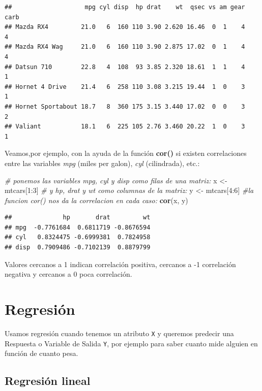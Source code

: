 \documentclass[]{book}
\newenvironment{Shaded}{\begin{snugshade}}{\end{snugshade}}
\newcommand{\KeywordTok}[1]{\textcolor[rgb]{0.13,0.29,0.53}{\textbf{{#1}}}}
\newcommand{\DecValTok}[1]{\textcolor[rgb]{0.00,0.00,0.81}{{#1}}}
\newcommand{\StringTok}[1]{\textcolor[rgb]{0.31,0.60,0.02}{{#1}}}
\newcommand{\CommentTok}[1]{\textcolor[rgb]{0.56,0.35,0.01}{\textit{{#1}}}}
\newcommand{\NormalTok}[1]{{#1}}
\theoremstyle{definition}
\theoremstyle{definition}
\theoremstyle{remark}
\begin{document}
\begin{verbatim}
##                    mpg cyl disp  hp drat    wt  qsec vs am gear carb
## Mazda RX4         21.0   6  160 110 3.90 2.620 16.46  0  1    4    4
## Mazda RX4 Wag     21.0   6  160 110 3.90 2.875 17.02  0  1    4    4
## Datsun 710        22.8   4  108  93 3.85 2.320 18.61  1  1    4    1
## Hornet 4 Drive    21.4   6  258 110 3.08 3.215 19.44  1  0    3    1
## Hornet Sportabout 18.7   8  360 175 3.15 3.440 17.02  0  0    3    2
## Valiant           18.1   6  225 105 2.76 3.460 20.22  1  0    3    1
\end{verbatim}

Veamos,por ejemplo, con la ayuda de la función \textbf{cor()} si existen
correlaciones entre las variables \emph{mpg} (miles per galon),
\emph{cyl} (cilindrada), etc.:

\begin{Shaded}
\begin{Highlighting}[]
\CommentTok{# ponemos las variables mpg, cyl y disp como filas de una matriz:}
\NormalTok{x <-}\StringTok{ }\NormalTok{mtcars[}\DecValTok{1}\NormalTok{:}\DecValTok{3}\NormalTok{] }
\CommentTok{# y hp, drat y wt como columnas de la matriz:}
\NormalTok{y <-}\StringTok{ }\NormalTok{mtcars[}\DecValTok{4}\NormalTok{:}\DecValTok{6}\NormalTok{]}
\CommentTok{#la funcion cor() nos da la correlacion en cada caso:}
\KeywordTok{cor}\NormalTok{(x, y)}
\end{Highlighting}
\end{Shaded}

\begin{verbatim}
##              hp       drat         wt
## mpg  -0.7761684  0.6811719 -0.8676594
## cyl   0.8324475 -0.6999381  0.7824958
## disp  0.7909486 -0.7102139  0.8879799
\end{verbatim}

Valores cercanos a 1 indican correlación positiva, cercanos a -1
correlación negativa y cercanos a 0 poca correlación.

\section{Regresión}\label{regresion}

Usamos regresión cuando tenemos un atributo \texttt{X} y queremos
predecir una Respuesta o Variable de Salida \texttt{Y}, por ejemplo para
saber cuanto mide alguien en función de cuanto pesa.

\subsection{Regresión lineal}\label{regresion-lineal}
\end{document}
